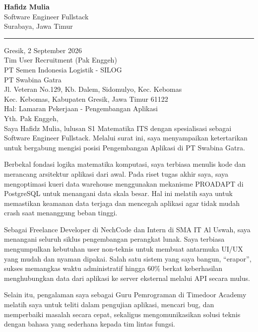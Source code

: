 \documentclass[a4paper,11pt]{article}
\begin{document}
{\Large\bfseries Hafidz Mulia}\\[2pt]
{\small Software Engineer Fullstack}\\[1pt]
{\small Surabaya, Jawa Timur}

\vspace{8pt}
\noindent\rule{\textwidth}{0.8pt}
\vspace{6pt}

Gresik, 2 September 2026\\[4pt]
Tim User Recruitment (Pak Enggeh)\\
PT Semen Indonesia Logistik - SILOG\\
PT Swabina Gatra\\
Jl. Veteran No.129, Kb. Dalem, Sidomulyo, Kec. Kebomas\\
Kec. Kebomas, Kabupaten Gresik, Jawa Timur 61122\\[4pt]
Hal: Lamaran Pekerjaan - Pengembangan Aplikasi\\[6pt]

Yth. Pak Enggeh,\\[4pt]

Saya Hafidz Mulia, lulusan S1 Matematika ITS dengan spesialisasi sebagai Software Engineer Fullstack. Melalui surat ini, saya menyampaikan ketertarikan untuk bergabung mengisi posisi Pengembangan Aplikasi di PT Swabina Gatra.

Berbekal fondasi logika matematika komputasi, saya terbiasa menulis kode dan merancang arsitektur aplikasi dari awal. Pada riset tugas akhir saya, saya mengoptimasi kueri data warehouse menggunakan mekanisme PROADAPT di PostgreSQL untuk menangani data skala besar. Hal ini melatih saya untuk memastikan keamanan data terjaga dan mencegah aplikasi agar tidak mudah crash saat menanggung beban tinggi.

Sebagai Freelance Developer di NechCode dan Intern di SMA IT Al Uswah, saya menangani seluruh siklus pengembangan perangkat lunak. Saya terbiasa mengumpulkan kebutuhan user non-teknis untuk membuat antarmuka UI/UX yang mudah dan nyaman dipakai. Salah satu sistem yang saya bangun, ``erapor'', sukses memangkas waktu administratif hingga 60\% berkat keberhasilan menghubungkan data dari aplikasi ke server eksternal melalui API secara mulus.

Selain itu, pengalaman saya sebagai Guru Pemrograman di Timedoor Academy melatih saya untuk teliti dalam pengujian aplikasi, mencari bug, dan memperbaiki masalah secara cepat, sekaligus mengomunikasikan solusi teknis dengan bahasa yang sederhana kepada tim lintas fungsi.
\end{document}
